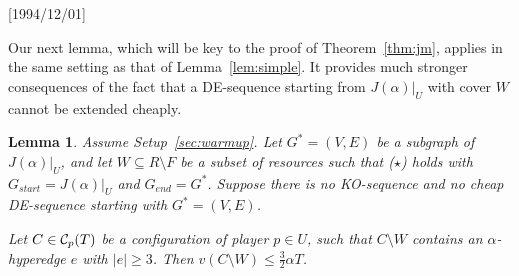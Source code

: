 \NeedsTeXFormat{LaTeX2e}[1994/12/01]\documentclass[letterpaper, 11pt]{article}
\newtheorem{lem}[thm]{Lemma}
\theoremstyle{definition}
\theoremstyle{remark}
\numberwithin{equation}{section}
\begin{document}
Our next lemma, which will be key to the proof of
  Theorem~\ref{thm:jm}, applies in the same setting as that of
Lemma~\ref{lem:simple}. It provides much stronger consequences of the
fact that a DE-sequence starting from $J(\alpha)|_U$ with cover $W$
cannot be extended cheaply. 

\begin{lem}\label{lem:nongraph}
  Assume Setup~\ref{sec:warmup}. Let $G^*= (V,E)$ be a subgraph of $J(\alpha)|_U$, and let  $W\subseteq
R \setminus F$ be a subset of resources such 
that ($\star$) holds with $G_{start}=J(\alpha)|_U$ and $G_{end}=G^*$.
  Suppose there is no KO-sequence and no cheap DE-sequence starting
  with $G^* = (V,E)$. 

  Let $C\in {\cal C}_p(T)$ be a configuration of player $p\in
  U$, such that $C\setminus W$ contains an $\alpha$-hyperedge $e$
  with $|e|\geq 3$.
Then $v(C\setminus W) \leq \frac{3}{2}\alpha T$. \end{lem}
\end{document}
